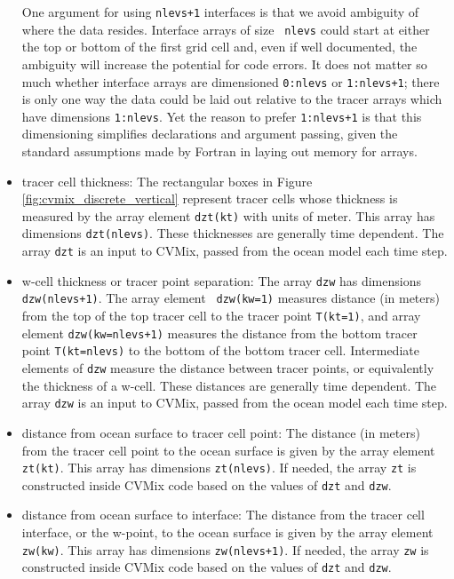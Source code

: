 \begin{itemize}
  One argument for using {\tt nlevs+1} interfaces is that we avoid
  ambiguity of where the data resides. Interface arrays of size {\tt
    nlevs} could start at either the top or bottom of the first grid
  cell and, even if well documented, the ambiguity will increase the
  potential for code errors.  It does not matter so much whether
  interface arrays are dimensioned {\tt 0:nlevs} or {\tt 1:nlevs+1};
  there is only one way the data could be laid out relative to the
  tracer arrays which have dimensions {\tt 1:nlevs}. Yet the reason to
  prefer {\tt 1:nlevs+1} is that this dimensioning simplifies
  declarations and argument passing, given the standard assumptions
  made by Fortran in laying out memory for arrays.

 
\item {\sc tracer cell thickness}: The rectangular boxes in Figure
  \ref{fig:cvmix_discrete_vertical} represent tracer cells whose
  thickness is measured by the array element {\tt dzt(kt)} with units
  of meter. This array has dimensions {\tt dzt(nlevs)}.  These
  thicknesses are generally time dependent.  The array {\tt dzt} is an
  input to CVMix, passed from the ocean model each time step.

\item {\sc w-cell thickness or tracer point separation}: The array
  {\tt dzw} has dimensions {\tt dzw(nlevs+1)}.  The array element {\tt
    dzw(kw=1)} measures distance (in meters) from the top of the top
  tracer cell to the tracer point {\tt T(kt=1)}, and array element
  {\tt dzw(kw=nlevs+1)} measures the distance from the bottom tracer
  point {\tt T(kt=nlevs)} to the bottom of the bottom tracer cell.
  Intermediate elements of {\tt dzw} measure the distance between
  tracer points, or equivalently the thickness of a w-cell.  These
  distances are generally time dependent.  The array {\tt dzw} is an
  input to CVMix, passed from the ocean model each time step.

\item {\sc distance from ocean surface to tracer cell point}: The
  distance (in meters) from the tracer cell point to the ocean surface
  is given by the array element {\tt zt(kt)}.  This array has
  dimensions {\tt zt(nlevs)}.  If needed, the array {\tt zt} is
  constructed inside CVMix code based on the values of {\tt dzt} and
  {\tt dzw}. 

\item {\sc distance from ocean surface to interface}: The distance
  from the tracer cell interface, or the w-point, to the ocean surface
  is given by the array element {\tt zw(kw)}.  This array has
  dimensions {\tt zw(nlevs+1)}.  If needed, the array {\tt zw} is
  constructed inside CVMix code based on the values of {\tt dzt} and
  {\tt dzw}.

\end{itemize}



